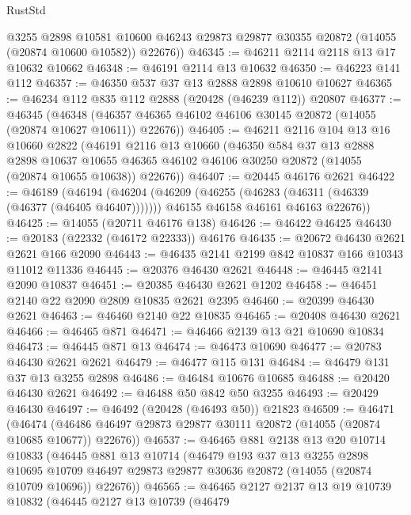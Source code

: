 \begin{lexlean}{RustStd}
\begin{coremodule}
        @3255
        @2898
        @10581
        @10600
        @46243
        @29873
        @29877
        @30355
        @20872
        (@14055 (@20874 @10600 @10582))
        @22676))
@46345 := @46211 @2114 @2118 @13 @17 @10632 @10662
@46348 := @46191 @2114 @13 @10632
@46350 := @46223 @141 @112
@46357 := @46350 @537 @37 @13 @2888 @2898 @10610 @10627
@46365 := @46234 @112 @835 @112 @2888 (@20428 (@46239 @112)) @20807
@46377 := @46345
    (@46348 (@46357 @46365 @46102 @46106 @30145 @20872 (@14055 (@20874 @10627 @10611)) @22676))
@46405 := @46211
    @2116
    @104
    @13
    @16
    @10660
    @2822
    (@46191
      @2116
      @13
      @10660
      (@46350
        @584
        @37
        @13
        @2888
        @2898
        @10637
        @10655
        @46365
        @46102
        @46106
        @30250
        @20872
        (@14055 (@20874 @10655 @10638))
        @22676))
@46407 := @20445 @46176 @2621
@46422 := @46189
    (@46194
      (@46204
        (@46209 (@46255 (@46283 (@46311 (@46339 (@46377 (@46405 @46407)))))))
        @46155
        @46158
        @46161
        @46163
        @22676))
@46425 := @14055 (@20711 @46176 @138)
@46426 := @46422 @46425
@46430 := @20183 (@22332 (@46172 @22333)) @46176
@46435 := @20672 @46430 @2621 @2621 @166 @2090
@46443 := @46435 @2141 @2199 @842 @10837 @166 @10343 @11012 @11336
@46445 := @20376 @46430 @2621
@46448 := @46445 @2141 @2090 @10837
@46451 := @20385 @46430 @2621 @1202
@46458 := @46451 @2140 @22 @2090 @2809 @10835 @2621 @2395
@46460 := @20399 @46430 @2621
@46463 := @46460 @2140 @22 @10835
@46465 := @20408 @46430 @2621
@46466 := @46465 @871
@46471 := @46466 @2139 @13 @21 @10690 @10834
@46473 := @46445 @871 @13
@46474 := @46473 @10690
@46477 := @20783 @46430 @2621 @2621
@46479 := @46477 @115 @131
@46484 := @46479 @131 @37 @13 @3255 @2898
@46486 := @46484 @10676 @10685
@46488 := @20420 @46430 @2621
@46492 := @46488 @50 @842 @50 @3255
@46493 := @20429 @46430
@46497 := @46492 (@20428 (@46493 @50)) @21823
@46509 := @46471
    (@46474 (@46486 @46497 @29873 @29877 @30111 @20872 (@14055 (@20874 @10685 @10677)) @22676))
@46537 := @46465
    @881
    @2138
    @13
    @20
    @10714
    @10833
    (@46445
      @881
      @13
      @10714
      (@46479
        @193
        @37
        @13
        @3255
        @2898
        @10695
        @10709
        @46497
        @29873
        @29877
        @30636
        @20872
        (@14055 (@20874 @10709 @10696))
        @22676))
@46565 := @46465
    @2127
    @2137
    @13
    @19
    @10739
    @10832
    (@46445
      @2127
      @13
      @10739
      (@46479

\end{coremodule}
\end{lexlean}
